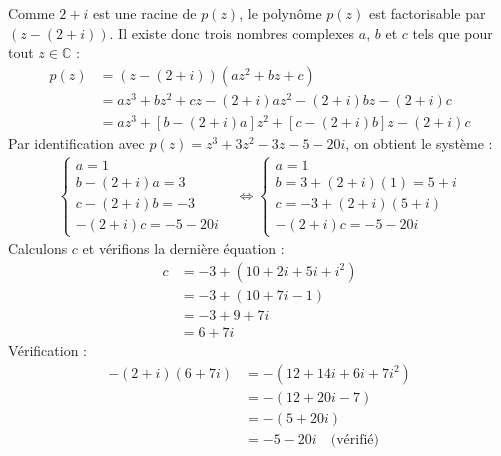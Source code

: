 \documentclass[12pt,a4paper]{article}
\begin{document}
\begin{enumerate}
\begin{enumerate}
        Comme $2 + i$ est une racine de $p(z)$, le polynôme $p(z)$ est factorisable par $(z - (2 + i))$. Il existe donc trois nombres complexes $a$, $b$ et $c$ tels que pour tout $z \in \mathbb{C}$ :
        $$
        \begin{aligned}
            p(z) &= (z - (2 + i))(az^2 + bz + c) \\
            &= az^3 + bz^2 + cz - (2 + i)az^2 - (2 + i)bz - (2 + i)c \\
            &= az^3 + \left[b - (2 + i)a\right]z^2 + \left[c - (2 + i)b\right]z - (2 + i)c
        \end{aligned}
        $$
        Par identification avec $p(z) = z^3 + 3z^2 - 3z - 5 - 20i$, on obtient le système :
        $$
        \begin{aligned}
            \left\{
            \begin{array}{l}
                a = 1 \\
                b - (2 + i)a = 3 \\
                c - (2 + i)b = -3 \\
                -(2 + i)c = -5 - 20i
            \end{array}
            \right.
            &\iff
            \left\{
            \begin{array}{l}
                a = 1 \\
                b = 3 + (2 + i)(1) = 5 + i \\
                c = -3 + (2 + i)(5 + i) \\
                -(2 + i)c = -5 - 20i
            \end{array}
            \right.
        \end{aligned}
        $$
        Calculons $c$ et vérifions la dernière équation :
        $$
        \begin{aligned}
            c &= -3 + (10 + 2i + 5i + i^2) \\
            &= -3 + (10 + 7i - 1) \\
            &= -3 + 9 + 7i \\
            &= 6 + 7i
        \end{aligned}
        $$
        Vérification :
        $$
        \begin{aligned}
            -(2 + i)(6 + 7i) &= -(12 + 14i + 6i + 7i^2) \\
            &= -(12 + 20i - 7) \\
            &= -(5 + 20i) \\
            &= -5 - 20i \quad \text{(vérifié)}

\end{aligned}$$
\end{enumerate}
\end{enumerate}
\end{document}
